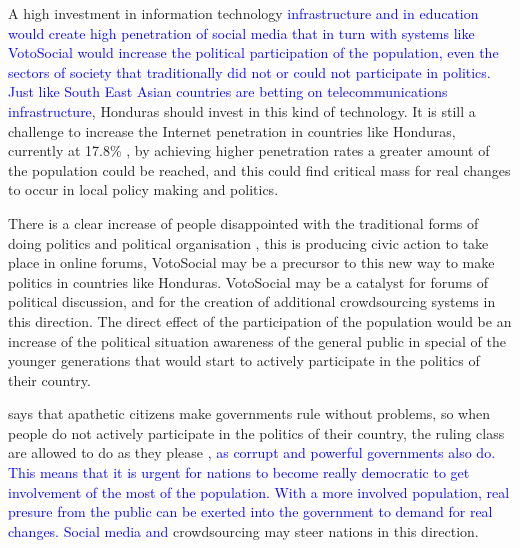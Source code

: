 \documentclass[letterpaper,10pt]{article}
\begin{document}
A high investment in information technology \textcolor{blue}{infrastructure and in education would create high penetration of social media \citep{saadia2014} that in turn with systems like VotoSocial would increase the political participation of the population, even the sectors of society that traditionally did not or could not participate in politics. Just like South East Asian countries are betting on telecommunications infrastructure}, Honduras should invest in this kind of technology. It is still a challenge to increase the Internet penetration in countries like Honduras, currently at 17.8\% \citep{webpenet}, by achieving higher penetration rates a greater amount of the population could be reached, and this could find critical mass for real changes to occur in local policy making and politics.

There is a clear increase of people disappointed with the traditional forms of doing politics and political organisation \citep{milan2013} , this is producing civic action to take place in online forums, VotoSocial may be a precursor to this new way to make politics in countries like Honduras. VotoSocial may be a catalyst for forums of political discussion, and for the creation of additional crowdsourcing systems in this direction. The direct effect of the participation of the population would be an increase of the political situation awareness of the general public in special of the younger generations that would start to actively participate in the politics of their country.

\cite{sartori2003} says that apathetic citizens make governments rule without problems, so when people do not actively participate in the politics of their country, the ruling class are allowed to do as they please \textcolor{blue}{, as corrupt and powerful governments also do. This means that it is urgent for nations to become really democratic to get involvement of the most of the population. With a more involved population, real presure from the public can be exerted into the government to demand for real changes. Social media and} crowdsourcing may steer nations in this direction.



\end{document}
